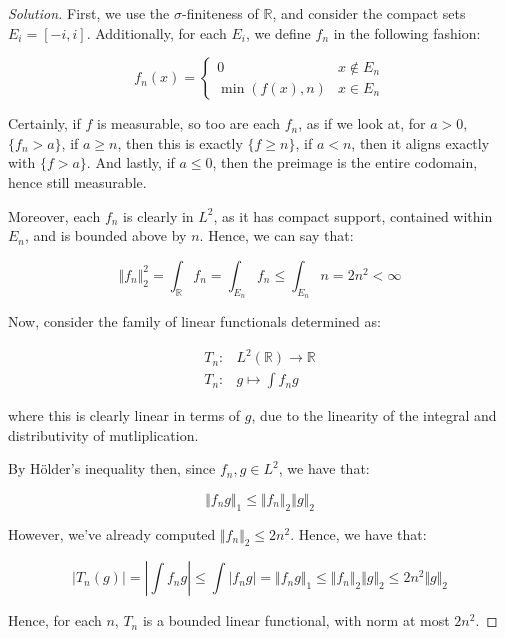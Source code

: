 \documentclass[10pt]{article}
\begin{document}
\begin{proof}[Solution]

First, we use the $\sigma$-finiteness of $\mathbb{R}$, and consider the compact sets $E_i = [ -i, i ]$. Additionally, for each $E_i$, we define $f_n$ in the following fashion:

$$ f_n(x) = \begin{cases} 0 & x \not \in E_n \\ \min(f(x), n) & x \in E_n \end{cases}$$

Certainly, if $f$ is measurable, so too are each $f_n$, as if we look at, for $a > 0$, $\{ f_n > a \}$, if $ a \geq n$, then this is exactly $\{ f \geq n \}$, if $ a < n$, then it aligns exactly with $ \{ f > a \}$. And lastly, if $a \leq 0$, then the preimage is the entire codomain, hence still measurable.

Moreover, each $f_n$ is clearly in $L^2$, as it has compact support, contained within $E_n$, and is bounded above by $n$. Hence, we can say that:

$$ \Vert f_n \Vert_2^2 = \int_{\mathbb{R}} f_n = \int_{E_n} f_n \leq \int_{E_n} n = 2n^2 < \infty $$

Now, consider the family of linear functionals determined as:

\begin{align*}
T_n: & L^2(\mathbb{R}) \to \mathbb{R} \\
T_n: & g \mapsto \int f_n g
\end{align*}

where this is clearly linear in terms of $g$, due to the linearity of the integral and distributivity of mutliplication.


By H\"older's inequality then, since $f_n, g \in L^2$, we have that:

$$ \Vert f_n g \Vert_1 \leq \Vert f_n \Vert_2 \Vert g \Vert_2$$

However, we've already computed $\Vert f_n \Vert_2 \leq 2n^2$. Hence, we have that:

$$ | T_n(g) | = \left| \int f_n g \right| \leq \int |f_n g | = \Vert f_n g \Vert_1 \leq \Vert f_n \Vert_2 \Vert g \Vert_2 \leq 2n^2 \Vert g \Vert_2 $$

Hence, for each $n$, $T_n$ is a bounded linear functional, with norm at most $2n^2$.


\end{proof}
\end{document}
